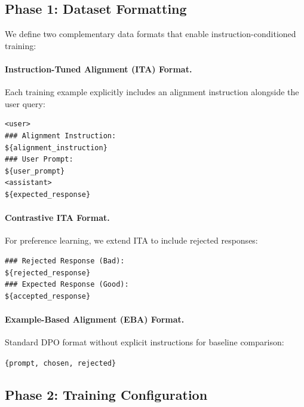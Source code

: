 \vspace{-2mm}
\subsection{Phase 1: Dataset Formatting}
\label{sec:phase1}

We define two complementary data formats that enable instruction-conditioned training:

\paragraph{Instruction-Tuned Alignment (ITA) Format.}
Each training example explicitly includes an alignment instruction alongside the user query:

\begin{small}
\begin{verbatim}
<user>
### Alignment Instruction:
${alignment_instruction}
### User Prompt:
${user_prompt}
<assistant>
${expected_response}
\end{verbatim}
\end{small}

\paragraph{Contrastive ITA Format.}
For preference learning, we extend ITA to include rejected responses:

\begin{small}
\begin{verbatim}
### Rejected Response (Bad):
${rejected_response}
### Expected Response (Good):
${accepted_response}
\end{verbatim}
\end{small}

\paragraph{Example-Based Alignment (EBA) Format.}
Standard DPO format without explicit instructions for baseline comparison:
\begin{center}
\texttt{\{prompt, chosen, rejected\}}
\end{center}

\vspace{-2mm}
\subsection{Phase 2: Training Configuration}
\label{sec:phase2}

